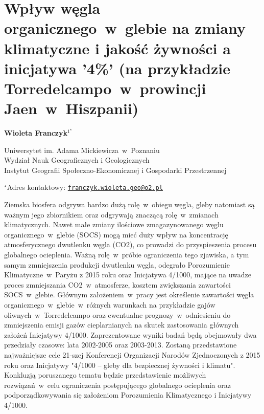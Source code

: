 \documentclass[\main/boa.tex]{subfiles}
\begin{document}
\section{Wpływ węgla organicznego~w~glebie na zmiany klimatyczne i jakość żywności a inicjatywa '4\%' (na przykładzie Torredelcampo~w~prowincji Jaen~w~Hiszpanii)}

\begin{center}
  {\bf {} Wioleta Franczyk$^{1^\star}$}
\end{center}

\vskip 0.3cm

\begin{affiliations}
\begin{enumerate}
\begin{minipage}{0.915\textwidth}
\centering
\item Uniwersytet im. Adama Mickiewicza~w~Poznaniu\\ Wydział Nauk Geograficznych i Geologicznych\\ Instytut Geografii Społeczno-Ekonomicznej i Gospodarki Przestrzennej \\[-2pt]
\end{minipage}
\end{enumerate}
$^\star$Adres kontaktowy: \href{mailto:franczyk.wioleta.geo@o2.pl}{\nolinkurl{franczyk.wioleta.geo@o2.pl}}\\
\end{affiliations}

\vskip 0.5cm


\vskip 0.5cm

Ziemska biosfera odgrywa bardzo dużą rolę~w~obiegu węgla, gleby natomiast są ważnym jego zbiornikiem oraz odgrywają znaczącą rolę~w~zmianach klimatycznych. Nawet małe zmiany ilościowe zmagazynowanego węglu organicznego~w~glebie (SOCS) mogą mieć duży wpływ na koncentrację atmosferycznego dwutlenku węgla (CO2), co prowadzi do przyspieszenia procesu globalnego ocieplenia. Ważną rolę~w~próbie ograniczenia tego zjawiska, a tym samym zmniejszenia produkcji dwutlenku węgla, odegrało Porozumienie Klimatyczne~w~Paryżu z 2015 roku oraz Inicjatywa 4/1000, mające na uwadze proces zmniejszania CO2~w~atmosferze, kosztem zwiększania zawartości SOCS~w~glebie. Głównym założeniem~w~pracy jest określenie zawartości węgla organicznego~w~glebie~w~różnych warunkach na przykładzie gajów oliwnych~w~Torredelcampo oraz ewentualne prognozy~w~odniesieniu do zmniejszenia emisji gazów cieplarnianych na skutek zastosowania głównych założeń Inicjatywy 4/1000. Zaprezentowane wyniki badań będą obejmowały dwa przedziały czasowe: lata 2002-2005 oraz 2003-2013. Zostaną przedstawione najważniejsze cele 21-szej Konferencji Organizacji Narodów Zjednoczonych z 2015 roku oraz Inicjatywy "4/1000 – gleby dla bezpiecznej żywności i klimatu". Konkluzją poruszanego tematu będzie przedstawienie możliwych rozwiązań~w~celu ograniczenia postępującego globalnego ocieplenia oraz podporządkowywania się założeniom Porozumienia Klimatycznego i Inicjatywy 4/1000.
\end{document}
